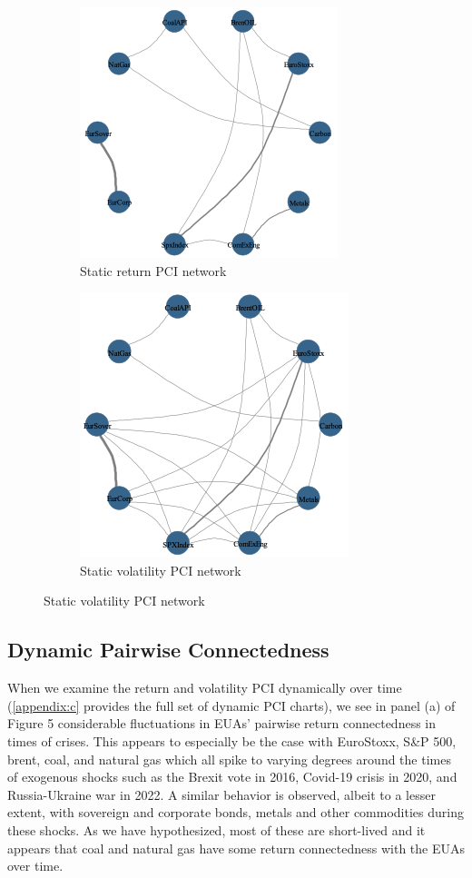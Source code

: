 \documentclass[preprint, 3p,
authoryear]{elsarticle} %
\begin{document}
\begin{figure}[H]
  \caption{Network representation of Pairwise Connectedness Index (PCI) (Jan 2013 – August 2024)}
  \label{fig:statPCI}
      \begin{subfigure}[b]{\textwidth}
        \centering
        \caption{Static return PCI network}
        \label{fig:statretPCI}
        \includegraphics[width = 0.45\linewidth]{4a-StatRetPCI}
      \end{subfigure}
      \begin{subfigure}[b]{\textwidth}
        \centering
        \bigskip
        \caption{Static volatility PCI network}
        \label{fig:statvolPCI}
        \includegraphics[width = 0.45\linewidth]{4b-StatVolPCI}
      \end{subfigure}
\end{figure}

\hypertarget{dynamic-pairwise-connectedness}{%
\subsection{Dynamic Pairwise
Connectedness}\label{dynamic-pairwise-connectedness}}

When we examine the return and volatility PCI dynamically over time
(\ref{appendix:c} provides the full set of dynamic PCI charts), we see
in panel (a) of Figure 5 considerable fluctuations in EUAs' pairwise
return connectedness in times of crises. This appears to especially be
the case with EuroStoxx, S\&P 500, brent, coal, and natural gas which
all spike to varying degrees around the times of exogenous shocks such
as the Brexit vote in 2016, Covid-19 crisis in 2020, and Russia-Ukraine
war in 2022. A similar behavior is observed, albeit to a lesser extent,
with sovereign and corporate bonds, metals and other commodities during
these shocks. As we have hypothesized, most of these are short-lived and
it appears that coal and natural gas have some return connectedness with
the EUAs over time.
\end{document}
